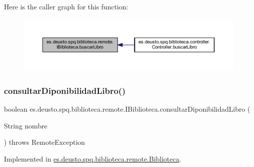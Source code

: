 Here is the caller graph for this function\+:
\nopagebreak
\begin{figure}[H]
\begin{center}
\leavevmode
\includegraphics[width=350pt]{interfacees_1_1deusto_1_1spq_1_1biblioteca_1_1remote_1_1_i_biblioteca_a29a3d22f9c3f8b84604eec2ab9955dfe_icgraph}
\end{center}
\end{figure}
\mbox{\label{interfacees_1_1deusto_1_1spq_1_1biblioteca_1_1remote_1_1_i_biblioteca_ae8795f9243cf23bff712d636c182193d}} 
\subsubsection{\texorpdfstring{consultar\+Diponibilidad\+Libro()}{consultarDiponibilidadLibro()}}
{\footnotesize\ttfamily boolean es.\+deusto.\+spq.\+biblioteca.\+remote.\+I\+Biblioteca.\+consultar\+Diponibilidad\+Libro (\begin{DoxyParamCaption}\item[{String}]{nombre }\end{DoxyParamCaption}) throws Remote\+Exception}



Implemented in \mbox{\hyperlink{classes_1_1deusto_1_1spq_1_1biblioteca_1_1remote_1_1_biblioteca_a43429c3eea8c1a6a49b6994439606ee3}{es.\+deusto.\+spq.\+biblioteca.\+remote.\+Biblioteca}}.

